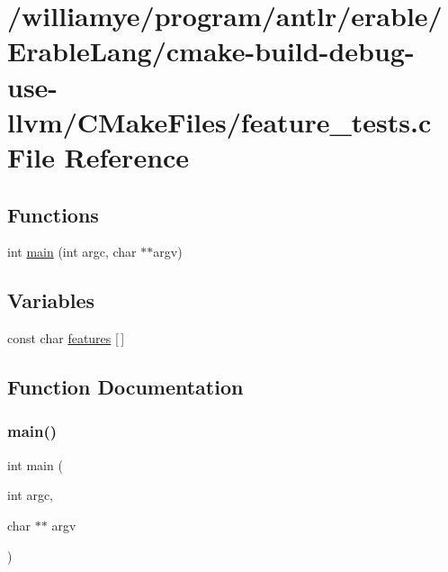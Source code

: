 \hypertarget{cmake-build-debug-use-llvm_2_c_make_files_2feature__tests_8c}{}\section{/williamye/program/antlr/erable/\+Erable\+Lang/cmake-\/build-\/debug-\/use-\/llvm/\+C\+Make\+Files/feature\+\_\+tests.c File Reference}
\label{cmake-build-debug-use-llvm_2_c_make_files_2feature__tests_8c}
\subsection*{Functions}
\begin{DoxyCompactItemize}
\item 
int \mbox{\hyperlink{cmake-build-debug-use-llvm_2_c_make_files_2feature__tests_8c_a3c04138a5bfe5d72780bb7e82a18e627}{main}} (int argc, char $\ast$$\ast$argv)
\end{DoxyCompactItemize}
\subsection*{Variables}
\begin{DoxyCompactItemize}
\item 
const char \mbox{\hyperlink{cmake-build-debug-use-llvm_2_c_make_files_2feature__tests_8c_a1582568e32f689337602a16bf8a5bff0}{features}} \mbox{[}$\,$\mbox{]}
\end{DoxyCompactItemize}


\subsection{Function Documentation}
\mbox{\label{cmake-build-debug-use-llvm_2_c_make_files_2feature__tests_8c_a3c04138a5bfe5d72780bb7e82a18e627}} 
\subsubsection{\texorpdfstring{main()}{main()}}
{\footnotesize\ttfamily int main (\begin{DoxyParamCaption}\item[{int}]{argc,  }\item[{char $\ast$$\ast$}]{argv }\end{DoxyParamCaption})}



